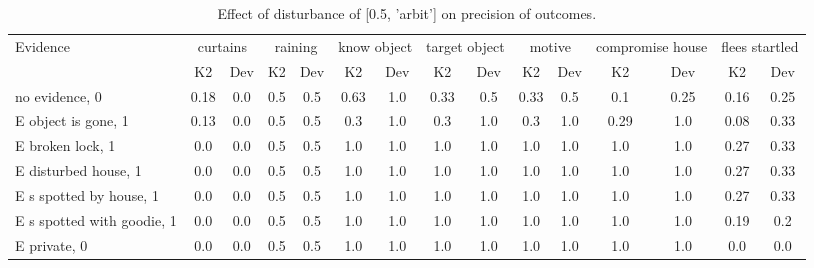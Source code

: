 \begin{table}\begin{tabular}{l|cc|cc|cc|cc|cc|cc|cc}\toprule\multirow{2}{*}{Evidence} & \multicolumn{2}{c}{curtains}& \multicolumn{2}{c}{raining}& \multicolumn{2}{c}{know object}& \multicolumn{2}{c}{target object}& \multicolumn{2}{c}{motive}& \multicolumn{2}{c}{compromise house}& \multicolumn{2}{c}{flees startled}\\& {K2} & {Dev}& {K2} & {Dev}& {K2} & {Dev}& {K2} & {Dev}& {K2} & {Dev}& {K2} & {Dev}& {K2} & {Dev}\\\midrule
no evidence, 0 & \cellcolor{Bittersweet}0.18&\cellcolor{Bittersweet}0.0&0.5&0.5&\cellcolor{Bittersweet}0.63&\cellcolor{Bittersweet}1.0&\cellcolor{Bittersweet}0.33&\cellcolor{Bittersweet}0.5&\cellcolor{Bittersweet}0.33&\cellcolor{Bittersweet}0.5&\cellcolor{Bittersweet}0.1&\cellcolor{Bittersweet}0.25&\cellcolor{Bittersweet}0.16&\cellcolor{Bittersweet}0.25\\E object is gone, 1 & \cellcolor{Bittersweet}0.13&\cellcolor{Bittersweet}0.0&0.5&0.5&\cellcolor{Bittersweet}0.3&\cellcolor{Bittersweet}1.0&\cellcolor{Bittersweet}0.3&\cellcolor{Bittersweet}1.0&\cellcolor{Bittersweet}0.3&\cellcolor{Bittersweet}1.0&\cellcolor{Bittersweet}0.29&\cellcolor{Bittersweet}1.0&\cellcolor{Bittersweet}0.08&\cellcolor{Bittersweet}0.33\\E broken lock, 1 & 0.0&0.0&0.5&0.5&1.0&1.0&1.0&1.0&1.0&1.0&1.0&1.0&\cellcolor{Bittersweet}0.27&\cellcolor{Bittersweet}0.33\\E disturbed house, 1 & 0.0&0.0&0.5&0.5&1.0&1.0&1.0&1.0&1.0&1.0&1.0&1.0&\cellcolor{Bittersweet}0.27&\cellcolor{Bittersweet}0.33\\E s spotted by house, 1 & 0.0&0.0&0.5&0.5&1.0&1.0&1.0&1.0&1.0&1.0&1.0&1.0&\cellcolor{Bittersweet}0.27&\cellcolor{Bittersweet}0.33\\E s spotted with goodie, 1 & 0.0&0.0&0.5&0.5&1.0&1.0&1.0&1.0&1.0&1.0&1.0&1.0&0.19&0.2\\E private, 0 & 0.0&0.0&0.5&0.5&1.0&1.0&1.0&1.0&1.0&1.0&1.0&1.0&0.0&0.0\\\bottomrule\end{tabular}\caption{Effect of disturbance of [0.5, 'arbit'] on precision of outcomes.}\end{table}